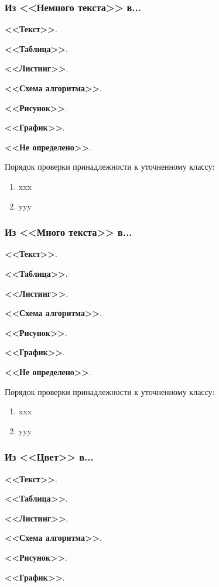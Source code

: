 \subsubsection*{Из <<Немного текста>> в...}

\textbf{<<Текст>>}.

\textbf{<<Таблица>>}.

\textbf{<<Листинг>>}.

\textbf{<<Схема алгоритма>>}.

\textbf{<<Рисунок>>}.

\textbf{<<График>>}.

\textbf{<<Не определено>>}.

Порядок проверки принадлежности к уточненному классу:
\begin{enumerate}
    \item xxx
    \item yyy
\end{enumerate}

\subsubsection*{Из <<Много текста>> в...}

\textbf{<<Текст>>}.

\textbf{<<Таблица>>}.

\textbf{<<Листинг>>}.

\textbf{<<Схема алгоритма>>}.

\textbf{<<Рисунок>>}.

\textbf{<<График>>}.

\textbf{<<Не определено>>}.

Порядок проверки принадлежности к уточненному классу:
\begin{enumerate}
    \item xxx
    \item yyy
\end{enumerate}

\subsubsection*{Из <<Цвет>> в...}

\textbf{<<Текст>>}.

\textbf{<<Таблица>>}.

\textbf{<<Листинг>>}.

\textbf{<<Схема алгоритма>>}.

\textbf{<<Рисунок>>}.

\textbf{<<График>>}.

